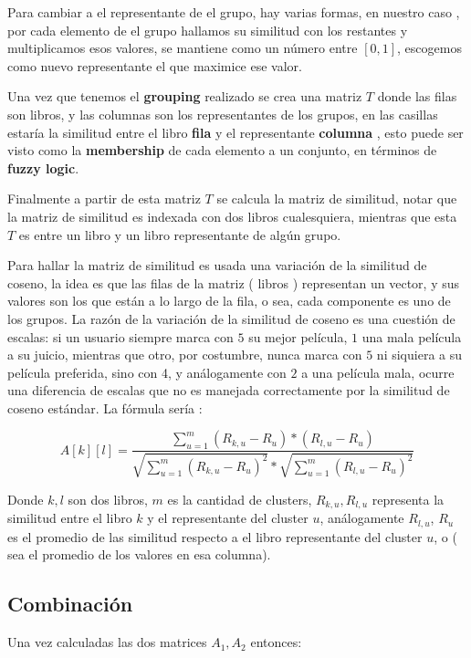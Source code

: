 \documentclass[14pt]{extarticle}
\begin{document}
Para cambiar a el representante de el grupo,  hay varias formas, en nuestro caso , por cada elemento de el grupo  hallamos su similitud con los restantes y multiplicamos esos valores, se mantiene como un número entre $[0, 1]$, escogemos como nuevo representante el que maximice ese valor.

Una vez que tenemos el \textbf{grouping} realizado se crea una matriz $T$ donde las filas son libros, y las columnas son los representantes de los grupos, en las casillas estaría la similitud entre el libro \textbf{fila} y el representante \textbf{columna} , esto puede ser visto como la \textbf{membership} de cada elemento a un conjunto, en términos de \textbf{fuzzy logic}.

Finalmente a partir de esta matriz $T$ se calcula la matriz de similitud, notar que la matriz de similitud es indexada con dos libros cualesquiera, mientras que esta $T$ es entre un libro y un libro representante de algún grupo.

Para hallar la matriz de similitud es usada una variación de la similitud de coseno, la idea es que las filas de la matriz ( libros ) representan un vector, y sus valores son los que están a lo largo de la fila, o sea, cada componente es uno de los grupos. La razón de la variación de la similitud de coseno es una cuestión de escalas: si un usuario siempre marca con $5$ su mejor película, $1$ una mala película a su juicio, mientras que otro, por costumbre, nunca marca con $5$ ni siquiera a su película preferida, sino con 4, y análogamente con $2$ a una película mala, ocurre una diferencia de escalas que no es manejada correctamente por la similitud de coseno estándar. La fórmula sería : 

$$A[k][l] = \frac{ \sum_{u = 1}^m (R_{k, u} - R_u)*(R_{l, u} - R_u) }{ \sqrt{\sum_{u = 1}^m (R_{k, u} - R_u)^2} * \sqrt{\sum_{u = 1}^m (R_{l, u} - R_u)^2} }$$

Donde $k, l$ son dos libros, $m$ es la cantidad de clusters, $R_{k,u}, R_{l,u}$ representa la similitud entre el libro $k$ y el representante del cluster $u$, análogamente $R_{l, u}$, $R_u$ es el promedio de las similitud respecto a el libro representante del cluster $u$, o ( sea el promedio de los valores en esa columna).

\subsection{Combinación}

Una vez calculadas las dos matrices $A_1, A_2$ entonces:
\end{document}

